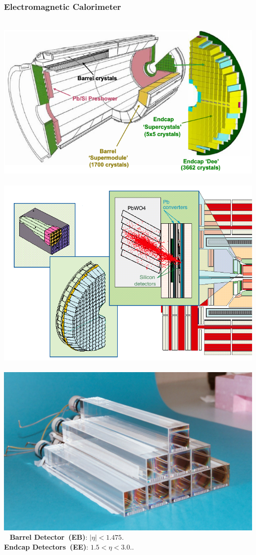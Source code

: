 \documentclass{beamer}
\begin{document}
\begin{frame}
 \frametitle{\Huge{Electromagnetic Calorimeter}}
    \begin{tcolorbox}[colback=UNL@Cream!5,colframe=UNL@Cream!70,title=\textcolor{UMN@Maroon}{\textbf{\Large{ECAL Subdetector}}}]
    \mbox{    
    \includegraphics[height=0.25\textwidth,width=0.35\linewidth]{THESISPLOTS/CMS-ECAL-EB-EE.png} \quad
    \includegraphics[height=0.25\textwidth,width=0.30\linewidth]{THESISPLOTS/New-Physics-PLOTS/ECAL_Crystals.png} \quad
    \includegraphics[height=0.25\textwidth,width=0.30\linewidth]{THESISPLOTS/New-Physics-PLOTS/CMS-ECAL-CRYS.jpg}
    }
 \textbf{Barrel Detector~(EB)}:  $|\eta| < 1.475$. \quad \\
  \textbf{Endcap Detectors~(EE)}: $1.5 < \eta < 3.0$..
  
    \end{tcolorbox} 
   

\end{frame}
\end{document}
